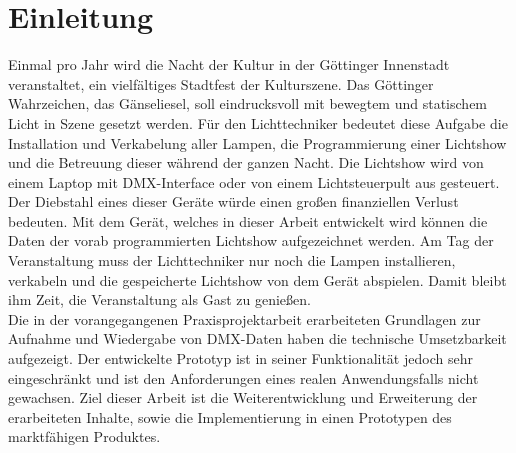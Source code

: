 
\newpage
\section{Einleitung}
Einmal pro Jahr wird die Nacht der Kultur in der Göttinger Innenstadt veranstaltet, ein vielfältiges Stadtfest der Kulturszene. Das Göttinger Wahrzeichen, das Gänseliesel, soll eindrucksvoll mit bewegtem und statischem Licht in Szene gesetzt werden. Für den Lichttechniker bedeutet diese Aufgabe die Installation und Verkabelung aller Lampen, die Programmierung einer Lichtshow und die Betreuung dieser während der ganzen Nacht. Die Lichtshow wird von einem Laptop mit DMX-Interface oder von einem Lichtsteuerpult aus gesteuert. Der Diebstahl eines dieser Geräte würde einen großen finanziellen Verlust bedeuten. Mit dem Gerät, welches in dieser Arbeit entwickelt wird können die Daten der vorab programmierten Lichtshow aufgezeichnet werden. Am Tag der Veranstaltung muss der Lichttechniker nur noch die Lampen installieren, verkabeln und die gespeicherte Lichtshow von dem Gerät abspielen. Damit bleibt ihm Zeit, die Veranstaltung als Gast zu genießen.\\
Die in der vorangegangenen Praxisprojektarbeit erarbeiteten Grundlagen zur Aufnahme und Wiedergabe von DMX-Daten haben die technische Umsetzbarkeit aufgezeigt. Der entwickelte Prototyp ist in seiner Funktionalität jedoch sehr eingeschränkt und ist den Anforderungen eines realen Anwendungsfalls nicht gewachsen. Ziel dieser Arbeit ist die Weiterentwicklung und Erweiterung der erarbeiteten Inhalte, sowie die Implementierung in einen Prototypen des marktfähigen Produktes.\\

